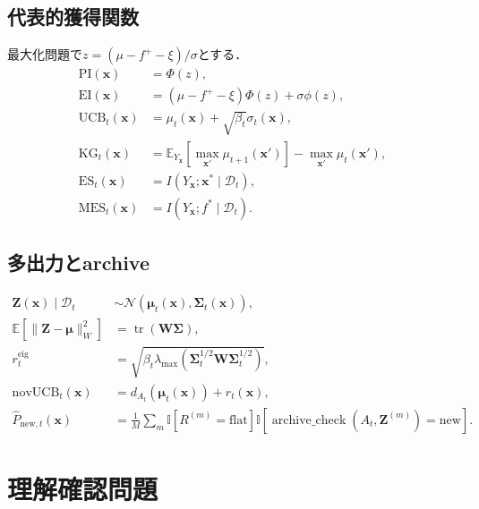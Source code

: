 \documentclass[a4paper,11pt]{ltjsarticle}
\newcommand{\E}{\mathbb E}
\newcommand{\N}{\mathcal N}
\newcommand{\D}{\mathcal D}
\newcommand{\tr}{\operatorname{tr}}
\newcommand{\ind}{\mathbb I}
\begin{document}
\subsection{代表的獲得関数}

最大化問題で\(z=(\mu-f^+-\xi)/\sigma\)とする．
\begin{align}
  \mathrm{PI}(\bm x)&=\Phi(z),\\
  \mathrm{EI}(\bm x)&=(\mu-f^+-\xi)\Phi(z)+\sigma\phi(z),\\
  \mathrm{UCB}_t(\bm x)&=\mu_t(\bm x)+\sqrt{\beta_t}\sigma_t(\bm x),\\
  \mathrm{KG}_t(\bm x)
  &=\E_{Y_{\bm x}}[\max_{\bm x'}\mu_{t+1}(\bm x')]-\max_{\bm x'}\mu_t(\bm x'),\\
  \mathrm{ES}_t(\bm x)&=I(Y_{\bm x};\bm x^*\mid\D_t),\\
  \mathrm{MES}_t(\bm x)&=I(Y_{\bm x};f^*\mid\D_t).
\end{align}

\subsection{多出力とarchive}

\begin{align}
  \bm Z(\bm x)\mid\D_t
  &\sim\N(\bm\mu_t(\bm x),\bm\Sigma_t(\bm x)),\\
  \E[\|\bm Z-\bm\mu\|_W^2]
  &=\tr(\bm W\bm\Sigma),\\
  r_t^{\mathrm{eig}}
  &=\sqrt{\beta_t\lambda_{\max}(\bm\Sigma_t^{1/2}\bm W\bm\Sigma_t^{1/2})},\\
  \mathrm{novUCB}_t(\bm x)
  &=d_{A_t}(\bm\mu_t(\bm x))+r_t(\bm x),\\
  \widehat P_{\mathrm{new},t}(\bm x)
  &=\frac1M\sum_m\ind[R^{(m)}=\mathrm{flat}]
  \ind[\operatorname{archive\_check}(A_t,\bm Z^{(m)})=\mathrm{new}].
\end{align}

\section{理解確認問題}
\label{sec:exercises}
\end{document}
